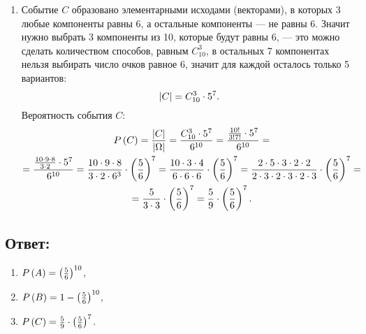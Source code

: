 \begin{enumerate}
    \item
    Событие $C$ образовано элементарными исходами (векторами), в которых 3 любые компоненты равны 6, а остальные компоненты ---
    не равны 6. Значит нужно выбрать 3 компоненты из 10, которые будут равны 6, --- это можно сделать количеством способов, равным $C_{10}^3$,
    в остальных 7 компонентах нельзя выбирать число очков равное 6, значит для каждой осталось только 5 вариантов:
    \begin{equation}
        \left | C \right | = C_{10}^3 \cdot 5^7 .
    \end{equation}
    Вероятность события $C$:
    \begin{multline}
        P \left ( C \right )
        = \frac{\left | C \right |}{\left | \Omega \right |}
        = \frac{C_{10}^3 \cdot 5^7}{6^{10}}
        = \frac{\frac{10!}{3!7!} \cdot 5^7}{6^{10}} = \\
        = \frac{\frac{10 \cdot 9 \cdot 8}{3 \cdot 2}  \cdot 5^7}{6^{10}}
        = \frac{10 \cdot 9 \cdot 8}{3 \cdot 2 \cdot 6^3} \cdot \left ( \frac{5}{6} \right )^7
        = \frac{10 \cdot 3 \cdot 4}{6 \cdot 6 \cdot 6} \cdot \left ( \frac{5}{6} \right )^7
        = \frac{2 \cdot 5 \cdot 3 \cdot 2 \cdot 2}{2 \cdot 3 \cdot 2 \cdot 3 \cdot 2 \cdot 3} \cdot \left ( \frac{5}{6} \right )^7 = \\
        = \frac{5}{3 \cdot 3} \cdot \left ( \frac{5}{6} \right )^7
        = \frac{5}{9} \cdot \left ( \frac{5}{6} \right )^7 .
    \end{multline}
\end{enumerate}

\subsection*{Ответ:}
\begin{enumerate}
    \item $P \left ( A \right ) = \left ( \frac{5}{6} \right )^{10}$,
    \item $P \left ( B \right ) = 1 - \left ( \frac{5}{6} \right )^{10}$,
    \item $P \left ( C \right ) = \frac{5}{9} \cdot \left ( \frac{5}{6} \right )^7$.
\end{enumerate}